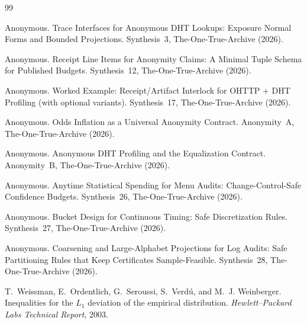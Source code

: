 \documentclass[11pt]{article}
\begin{document}
\begin{thebibliography}{99}\small

Anonymous.
\newblock Trace Interfaces for Anonymous DHT Lookups: Exposure Normal Forms and Bounded Projections.
\newblock Synthesis~3, The-One-True-Archive (2026).

Anonymous.
\newblock Receipt Line Items for Anonymity Claims: A Minimal Tuple Schema for Published Budgets.
\newblock Synthesis~12, The-One-True-Archive (2026).

Anonymous.
\newblock Worked Example: Receipt/Artifact Interlock for OHTTP + DHT Profiling (with optional variants).
\newblock Synthesis~17, The-One-True-Archive (2026).

Anonymous.
\newblock Odds Inflation as a Universal Anonymity Contract.
\newblock Anonymity~A, The-One-True-Archive (2026).

Anonymous.
\newblock Anonymous DHT Profiling and the Equalization Contract.
\newblock Anonymity~B, The-One-True-Archive (2026).

Anonymous.
\newblock Anytime Statistical Spending for Menu Audits: Change-Control-Safe Confidence Budgets.
\newblock Synthesis~26, The-One-True-Archive (2026).

Anonymous.
\newblock Bucket Design for Continuous Timing: Safe Discretization Rules.
\newblock Synthesis~27, The-One-True-Archive (2026).

Anonymous.
\newblock Coarsening and Large-Alphabet Projections for Log Audits: Safe Partitioning Rules that Keep Certificates Sample-Feasible.
\newblock Synthesis~28, The-One-True-Archive (2026).

T.~Weissman, E.~Ordentlich, G.~Seroussi, S.~Verd\'u, and M.~J. Weinberger.
\newblock Inequalities for the $L_1$ deviation of the empirical distribution.
\newblock \emph{Hewlett--Packard Labs Technical Report}, 2003.

\end{thebibliography}
\end{document}
